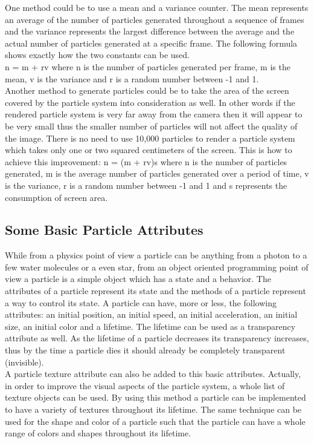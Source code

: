 One method could be to use a mean and a variance counter. The mean represents an average of the number of particles generated throughout a sequence of frames and the variance represents the largest difference between the average and the actual number of particles generated at a specific frame. The following formula shows exactly how the two constants can be used.\\
n = m + rv where n is the number of particles generated per frame, m is the mean, v is the variance and r is a random number between -1 and 1.\\

Another method to generate particles could be to take the area of the screen covered by the particle system into consideration as well. In other words if the rendered particle system is very far away from the camera then it will appear to be very small thus the smaller number of particles will not affect the quality of the image. There is no need to use 10,000 particles to render a particle system which takes only one or two squared centimeters of the screen. This is how to achieve this improvement: n = (m + rv)s where n is the number of particles generated, m is the average number of particles generated over a period of time, v is the variance, r is a random number between -1 and 1 and s represents the consumption of screen area.\\

\newpage
\subsection{Some Basic Particle Attributes}
While from a physics point of view a particle can be anything from a photon to a few water molecules or a even star, from an object oriented programming point of view a particle is a simple object which has a state and a behavior. The attributes of a particle represent its state and the methods of a particle represent a way to control its state. A particle can have, more or less, the following attributes: an initial position, an initial speed, an initial acceleration, an initial size, an initial color and a lifetime. The lifetime can be used as a transparency attribute as well. As the lifetime of a particle decreases its transparency increases, thus by the time a particle dies it should already be completely transparent (invisible).\\

A particle texture attribute can also be added to this basic attributes. Actually, in order to improve the visual aspects of the particle system, a whole list of texture objects can be used. By using this method a particle can be implemented to have a variety of textures throughout its lifetime. The same technique can be used for the shape and color of a particle such that the particle can have a whole range of colors and shapes throughout its lifetime.\\


